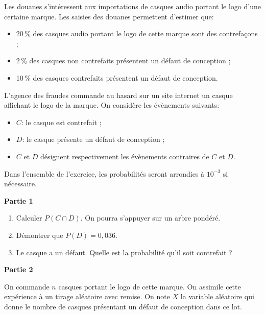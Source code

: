 \documentclass[10pt,a4paper]{article}
\begin{document}
\medskip

Les douanes s'intéressent aux importations de casques audio portant le logo d'une certaine marque. Les saisies des douanes permettent d'estimer que:

\setlength\parindent{10mm}
\begin{itemize}
    \item[$\bullet~~$] 20\,\% des casques audio portant le logo de cette marque sont des contrefaçons ;
    \item[$\bullet~~$] 2\,\% des casques non contrefaits présentent un défaut de conception ;\item[$\bullet~~$] 10\,\% des casques contrefaits présentent un défaut de conception.
\end{itemize}
\setlength\parindent{0mm}

L'agence des fraudes commande au hasard sur un site internet un casque affichant le logo de la marque. On considère les évènements suivants:

\setlength\parindent{10mm}
\begin{itemize}
    \item[$\bullet~~$] $C$: \og le casque est contrefait \fg{} ;
    \item[$\bullet~~$] $D$: \og le casque présente un défaut de conception \fg{} ;
    \item[$\bullet~~$] $\overline{C}$ et $\overline{D}$ désignent respectivement les évènements contraires de $C$ et $D$.
\end{itemize}
\setlength\parindent{0mm}

Dans l'ensemble de l'exercice, les probabilités seront arrondies à $10^{-3}$ si nécessaire.

\bigskip

\textbf{Partie 1}

\medskip

\begin{enumerate}
    \item Calculer $P(C \cap D)$. On pourra s'appuyer sur un arbre pondéré.
    \item Démontrer que $P(D) = 0,036$.
    \item Le casque a un défaut. Quelle est la probabilité qu'il soit contrefait ?
\end{enumerate}

\bigskip

\textbf{Partie 2}

\medskip

On commande $n$ casques portant le logo de cette marque. On assimile cette expérience à
un tirage aléatoire avec remise. On note $X$ la variable aléatoire qui donne le nombre de casques présentant un défaut de conception dans ce lot.
\end{document}
